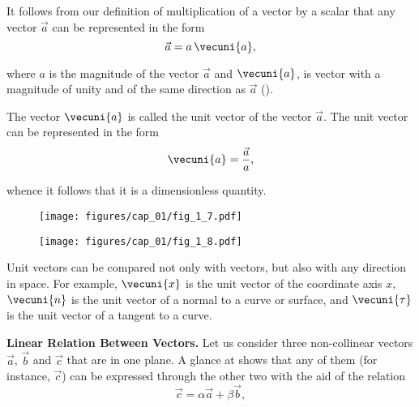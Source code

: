 It follows from our definition of multiplication of a vector by a scalar that any vector $\vec{a}$ can be represented in the form
\begin{equation}\label{eq:1_3}
\vec{a} = a\,\vecuni{a},
\end{equation} 

\noindent
where $a$ is the magnitude of the vector $\vec{a}$ and $\vecuni{a}$, is vector with a magnitude of unity and of the same direction as $\vec{a}$ ().

The vector $\vecuni{a}$ is called the unit vector of the vector $\vec{a}$. The unit vector can be represented in the form
\begin{equation}\label{eq:1_4}
\vecuni{a} = \frac{\vec{a}}{a},
\end{equation}

\noindent
whence it follows that it is a dimensionless quantity.

\begin{figure}[t]
	\begin{minipage}[t]{0.5\linewidth}
		\begin{center}
			\texttt{[image: figures/cap\_01/fig\_1\_7.pdf]}
			\caption[]{}
			\label{fig:1_7}
		\end{center}
	\end{minipage}
	\hfill{ }%
	\begin{minipage}[t]{0.5\linewidth}
		\begin{center}
			\texttt{[image: figures/cap\_01/fig\_1\_8.pdf]}
			\caption[]{}
			\label{fig:1_8}
		\end{center}
	\end{minipage}
\vspace{-0.6cm}
\end{figure}

Unit vectors can be compared not only with vectors, but also with any direction in space. For example, $\vecuni{x}$ is the unit vector of the coordinate axis $x$, $\vecuni{n}$ is the unit vector of a normal to a curve or surface, and $\vecuni{\tau}$ is the unit vector of a tangent to a curve.

\textbf{Linear Relation Between Vectors.} Let us consider three non-collinear vectors $\vec{a}$, $\vec{b}$ and $\vec{c}$ that are in one plane. A glance at  shows that any of them (for instance, $\vec{c}$) can be expressed through the other two with the aid of the relation
\begin{equation}\label{eq:1_5}
\vec{c} = \alpha\vec{a} + \beta\vec{b},
\end{equation}

